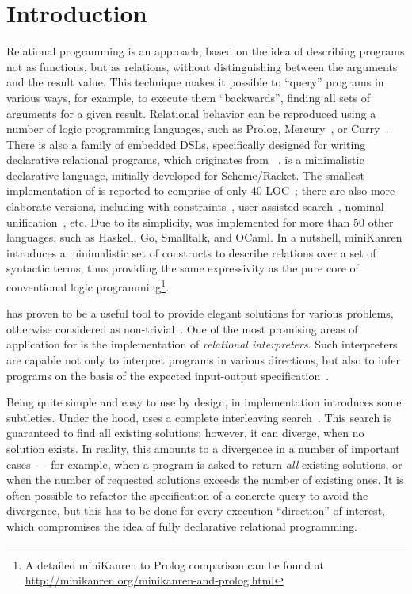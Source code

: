 \section{Introduction}

Relational programming is an approach, based on the idea of describing programs not as functions, but 
as relations, without distinguishing between the arguments and the result value. This technique makes it 
possible to ``query'' programs in various ways, for example, to execute them ``backwards'', finding
all sets of arguments for a given result. Relational behavior can be reproduced using a number of
logic programming languages, such as Prolog, Mercury~\cite{Mercury}, 
or Curry~\cite{Curry}. 
There is also a family of embedded DSLs, specifically designed for writing declarative relational
programs, which originates from \miniKanren~\cite{TRS}. \miniKanren is a minimalistic 
declarative language, initially developed for Scheme/Racket. The smallest implementation of \miniKanren 
is reported to comprise of only 40 LOC~\cite{MicroKanren,2016}; there are also more elaborate versions, including
\miniKanren with constraints~\cite{CKanren,CKanren1}, user-assisted search~\cite{Guided}, nominal unification~\cite{AlphaKanren},
etc. Due to its simplicity, \miniKanren was implemented for more than 50 other languages, such as
Haskell, Go, Smalltalk, and OCaml. In a nutshell, miniKanren introduces a minimalistic set of constructs to describe
relations over a set of syntactic terms, thus providing the same expressivity as the pure core of conventional
logic programming\footnote{A detailed miniKanren to Prolog comparison can be found at \url{http://minikanren.org/minikanren-and-prolog.html}}. 

\miniKanren has proven to be a useful tool to provide elegant solutions for various problems, otherwise considered as
non-trivial~\cite{WillThesis}. One of the most promising areas of application for \miniKanren is the implementation of
\emph{relational interpreters}. Such interpreters are capable not only to interpret programs in various directions, but also
to infer programs on the basis of the expected input-output specification~\cite{Untagged}.

Being quite simple and easy to use by design, in implementation \miniKanren introduces some subtleties. Under the hood, \miniKanren 
uses a complete interleaving search~\cite{Search}. This search is guaranteed to find all existing solutions; however, it can diverge, when no 
solution exists. In reality, this amounts to a divergence in a number of important cases~--- for example, when a program is asked to 
return \emph{all} existing solutions, or when the number of requested solutions exceeds the number of existing ones.
It is often possible to refactor the specification of a concrete query to avoid the divergence, but this has to be done for every execution
``direction'' of interest, which compromises the idea of fully declarative relational programming.

